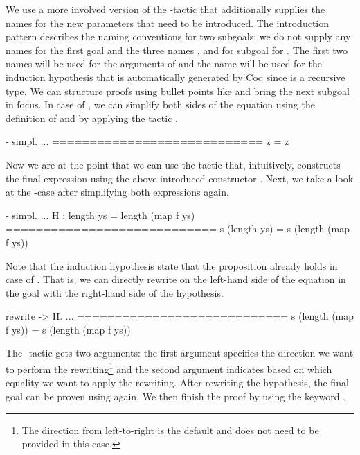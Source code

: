 We use a more involved version of the -tactic that additionally supplies the names for the new parameters that need to be introduced.
The introduction pattern \cinl{[ | y ys H ]} describes the naming conventions for two subgoals: we do not supply any names for the first goal and the three names ,  and  for subgoal for .
The first two names will be used for the arguments of  and the name  will be used for the induction hypothesis that is automatically generated by Coq since  is a recursive type.
We can structure proofs using bullet points like \cinl{-,+,*} and bring the next subgoal in focus.
In case of , we can simplify both sides of the equation using the definition of  and  by applying the tactic .

\begin{cproof}{- simpl.}
  ...
  ============================
  z = z
\end{cproof}

Now we are at the point that we can use the tactic  that, intuitively, constructs the final expression using the above introduced constructor .
Next, we take a look at the -case after simplifying both expressions again.

\begin{cproof}{- simpl.}
  ...
  H : length ys = length (map f ys)
  ============================
  s (length ys) = s (length (map f ys))
\end{cproof}

Note that the induction hypothesis  state that the proposition already holds in case of .
That is, we can directly rewrite  on the left-hand side of the equation in the goal with the right-hand side of the hypothesis.

\begin{cproof}{rewrite -> H.}
  ...
  ============================
  s (length (map f ys)) =
  s (length (map f ys))
\end{cproof}

The -tactic gets two arguments: the first argument specifies the direction we want to perform the rewriting\footnote{The direction from left-to-right is the default and does not need to be provided in this case.} and the second argument indicates based on which equality we want to apply the rewriting.
After rewriting the hypothesis, the final goal can be proven using  again.
We then finish the proof by using the keyword .

